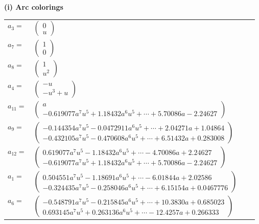 \documentclass[1p]{elsarticle_modified}
\theoremstyle{definition}
\begin{document}
\flushleft \textbf{(i) Arc colorings}\\
\begin{tabular}{m{7pt} m{180pt} m{7pt} m{180pt} }
\flushright $a_{3}=$&$\begin{pmatrix}0\\u\end{pmatrix}$ \\
\flushright $a_{7}=$&$\begin{pmatrix}1\\0\end{pmatrix}$ \\
\flushright $a_{8}=$&$\begin{pmatrix}1\\u^2\end{pmatrix}$ \\
\flushright $a_{4}=$&$\begin{pmatrix}- u\\- u^3+u\end{pmatrix}$ \\
\flushright $a_{11}=$&$\begin{pmatrix}a\\-0.619077 a^{7} u^{5}+1.18432 a^{6} u^{5}+\cdots+5.70086 a-2.24627\end{pmatrix}$ \\
\flushright $a_{9}=$&$\begin{pmatrix}-0.144354 a^{7} u^{5}-0.0472911 a^{6} u^{5}+\cdots+2.04271 a+1.04864\\-0.432105 a^{7} u^{5}-0.470608 a^{6} u^{5}+\cdots+6.51432 a+0.283008\end{pmatrix}$ \\
\flushright $a_{12}=$&$\begin{pmatrix}0.619077 a^{7} u^{5}-1.18432 a^{6} u^{5}+\cdots-4.70086 a+2.24627\\-0.619077 a^{7} u^{5}+1.18432 a^{6} u^{5}+\cdots+5.70086 a-2.24627\end{pmatrix}$ \\
\flushright $a_{1}=$&$\begin{pmatrix}0.504551 a^{7} u^{5}-1.18691 a^{6} u^{5}+\cdots-6.01844 a+2.02586\\-0.324435 a^{7} u^{5}-0.258046 a^{6} u^{5}+\cdots+6.15154 a+0.0467776\end{pmatrix}$ \\
\flushright $a_{6}=$&$\begin{pmatrix}-0.548791 a^{7} u^{5}-0.215845 a^{6} u^{5}+\cdots+10.3830 a+0.685023\\0.693145 a^{7} u^{5}+0.263136 a^{6} u^{5}+\cdots-12.4257 a+0.266333\end{pmatrix}$ \\

\end{tabular}
\end{document}
